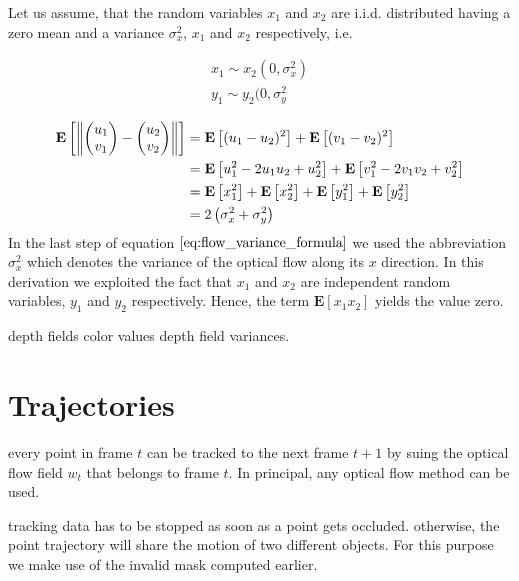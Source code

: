 Let us assume, that the random variables $x_1$ and $x_2$ are i.i.d. distributed having a zero mean and a variance $\sigma_x^2$, $x_1$ and $x_2$ respectively, i.e.

\begin{equation}
\begin{aligned}
x_1 \sim x_2 (0, \sigma_x^2) \\
y_1 \sim y_2 (0, \sigma_y^2
\end{aligned}
\label{eq:def_flow_tracking}	
\end{equation}

\begin{equation}
\begin{aligned}
\mathbf{E} \left[ \norm{\colvec{u_1}{v_1} - \colvec{u_2}{v_2}} \right]
& = \mathbf{E} \left[ (u_1 - u_2)^2 \right] + \mathbf{E} \left[ (v_1 - v_2)^2 \right] \\
& = \mathbf{E} \left[ u_1^2 - 2 u_1 u_2 + u_2^2 \right] + \mathbf{E} \left[ v_1^2 - 2 v_1 v_2 + v_2^2 \right] \\
& = \mathbf{E} \left[ x_1^2 \right] + \mathbf{E} \left[ x_2^2 \right] + \mathbf{E} \left[ y_1^2 \right] + \mathbf{E} \left[ y_2^2 \right] \\
& = 2 \left( \sigma_x^2 + \sigma_y^2 \right)
\end{aligned}
\label{eq:flow_variance_formula}	
\end{equation}
In the last step of equation $\ref{eq:flow_variance_formula}$ we used the abbreviation $\sigma_x^2$ which denotes the variance of the optical flow along its $x$ direction. In this derivation we exploited the fact that $x_1$ and $x_2$ are independent random variables, $y_1$ and $y_2$ respectively. Hence, the term $\mathbf{E} \left[ x_1 x_2\right]$ yields the value zero.


depth fields
color values
depth field variances.



\section{Trajectories}

every point in frame $t$ can be tracked to the next frame $t+1$ by suing the optical flow field $w_t$ that belongs to frame $t$. In principal, any optical flow method can be used.

tracking data has to be stopped as soon as a point gets occluded. otherwise, the point trajectory will share the motion of two different objects. For this purpose we make use of the invalid mask computed earlier.

